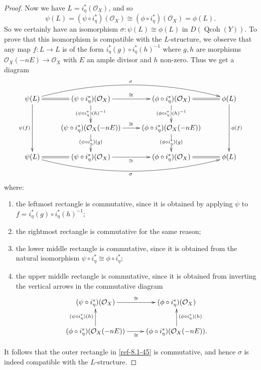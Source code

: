 \documentclass{amsart}
\numberwithin{equation}{section}
\let\cal\mathcal
\theoremstyle{definition}
\theoremstyle{remark}
\begin{document}
\begin{proof}
Now we have $L=i^\ast_\eta({{\cal O}}_X)$, and so
\[
\psi(L)=(\psi\circ i^\ast_\eta)({{\cal O}}_X)\cong (\phi\circ i^\ast_\eta)({{\cal O}}_X)=\phi(L).
\]
So we certainly have an isomorphism $\sigma:\psi(L)\cong \phi(L)$ in $D({\operatorname{Qcoh}}(Y))$. To prove that this isomorphism is
compatible with the $L$-structure, we observe that any map $f:L{\rightarrow} L$ is of the form
$i^\ast_\eta(g)\circ i^\ast_\eta(h)^{-1}$ where $g,h$ are morphisms ${{\cal O}}_X(-nE){\rightarrow} {{\cal O}}_X$ with $E$ an ample divisor and 
$h$ non-zero. Thus we get a diagram
\begin{equation}
\label{ref-8.1-45}
\xymatrix{
\psi(L)\ar@/^2em/[rrr]^\sigma
\ar[dd]_{\psi(f)}\ar@{=}[r] 
&(\psi\circ i^\ast_\eta)({{\cal O}}_X)\ar[r]^{\cong} \ar[d]|{(\psi \circ i^\ast_\eta)(h)^{-1}}
&(\phi\circ i^\ast_\eta)({{\cal O}}_X) \ar@{=}[r]\ar[d]|{(\phi \circ i^\ast_\eta)(h)^{-1}}
&\phi(L)\ar[dd]^{\phi(f)}
\\
&(\psi\circ i^\ast_\eta)({{\cal O}}_X(-nE))\ar[r]^{\cong} \ar[d]|{(\psi \circ i^\ast_\eta)(g)} 
 &(\phi\circ i^\ast_\eta)({{\cal O}}_X(-nE))\ar[d]|{(\phi \circ i^\ast_\eta)(g)}\\
\psi(L)\ar@{=}[r]\ar@/_2em/[rrr]_\sigma &(\psi\circ i^\ast_\eta)({{\cal O}}_X)\ar[r]_{\cong} &(\phi\circ i^\ast_\eta)({{\cal O}}_X) \ar@{=}[r]&\phi(L)
}
\end{equation}
where:
\begin{enumerate}
\item the leftmost rectangle is commutative, since it is obtained by applying $\psi$ to
$f=i^\ast_\eta(g)\circ i^\ast_\eta(h)^{-1}$;
\item the rightmost rectangle is commutative for the same reason;
\item the lower middle rectangle is commutative, since it is obtained from the natural
isomorphism $\psi\circ i^\ast_\eta\cong \phi\circ i^\ast_\eta$;
\item the upper middle rectangle is commutative, since it is obtained from inverting the
vertical arrows in the 
commutative diagram
\[
\xymatrix{
(\psi\circ i^\ast_\eta)({{\cal O}}_X)\ar[r]^{\cong} 
&(\phi\circ i^\ast_\eta)({{\cal O}}_X) \\
(\phi\circ i^\ast_\eta)({{\cal O}}_X(-nE))\ar[u]^{(\psi \circ i^\ast_\eta)(h)} \ar[r]_{\cong}&(\phi\circ i^\ast_\eta)({{\cal O}}_X(-nE)) \ar[u]_{(\phi \circ i^\ast_\eta)(h)}.
}
\]
\end{enumerate}
It follows that the outer rectangle in \eqref{ref-8.1-45} is commutative, and hence $\sigma$ is indeed
compatible with the $L$-structure.
\end{proof}
\end{document}
